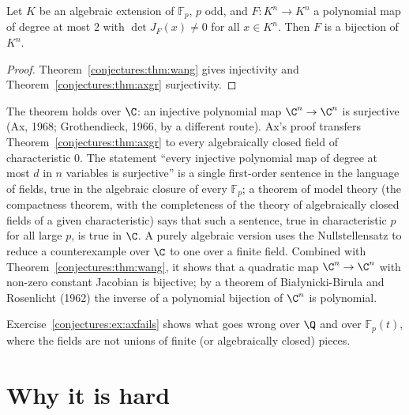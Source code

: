 \begin{corollary}\label{conjectures:cor:wangfin}
Let $K$ be an algebraic extension of $\mathbb F_p$, $p$ odd, and $F:K^n\to K^n$ a polynomial map of degree at most $2$ with $\det J_F(x)\ne0$ for all $x\in K^n$.
Then $F$ is a bijection of $K^n$.
\end{corollary}
\begin{proof}
Theorem~\ref{conjectures:thm:wang} gives injectivity and Theorem~\ref{conjectures:thm:axgr} surjectivity.
\end{proof}

\begin{remark}\label{conjectures:rem:axC}
The theorem holds over $\C$: an injective polynomial map $\C^n\to\C^n$ is surjective (Ax, 1968; Grothendieck, 1966, by a different route). Ax's proof
transfers Theorem~\ref{conjectures:thm:axgr} to every algebraically closed field of characteristic $0$. The statement ``every injective polynomial map of degree at most
$d$ in $n$ variables is surjective'' is a single first-order sentence in the language of fields, true in the algebraic closure of every $\mathbb F_p$; a theorem
of model theory (the compactness theorem, with the completeness of the theory of algebraically closed fields of a given characteristic) says that such a
sentence, true in characteristic $p$ for all large $p$, is true in $\C$. A purely algebraic version uses the Nullstellensatz to reduce a counterexample
over $\C$ to one over a finite field. Combined with Theorem~\ref{conjectures:thm:wang}, it shows that a quadratic map $\C^n\to\C^n$ with non-zero constant
Jacobian is bijective; by a theorem of Bia\l ynicki-Birula and Rosenlicht (1962) the inverse of a polynomial bijection of $\C^n$ is polynomial.
\end{remark}

Exercise~\ref{conjectures:ex:axfails} shows what goes wrong over $\Q$ and over $\mathbb F_p(t)$, where the fields are not unions of finite (or algebraically closed)
pieces.

\section{Why it is hard}

